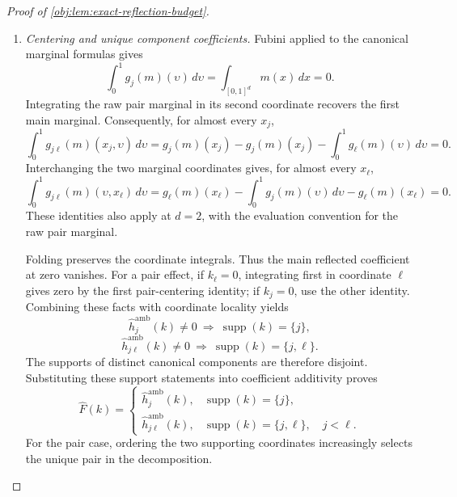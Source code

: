 \begin{proof}[Proof of \cref{obj:lem:exact-reflection-budget}]
\begin{enumerate}
\item \textit{Centering and unique component coefficients.}
Fubini applied to the canonical marginal formulas gives
\[
\int_0^1g_j(m)(\upsilon)\,d\upsilon
=
\int_{[0,1]^d}m(x)\,dx
=
0.
\]
Integrating the raw pair marginal in its second coordinate recovers the first main marginal. Consequently, for almost every \(x_j\),
\[
\int_0^1g_{j\ell}(m)(x_j,\upsilon)\,d\upsilon
=
g_j(m)(x_j)-g_j(m)(x_j)
-\int_0^1g_\ell(m)(\upsilon)\,d\upsilon
=
0.
\]
Interchanging the two marginal coordinates gives, for almost every \(x_\ell\),
\[
\int_0^1g_{j\ell}(m)(\upsilon,x_\ell)\,d\upsilon
=
g_\ell(m)(x_\ell)
-\int_0^1g_j(m)(\upsilon)\,d\upsilon
-g_\ell(m)(x_\ell)
=
0.
\]
These identities also apply at \(d=2\), with the evaluation convention for the raw pair marginal.

Folding preserves the coordinate integrals. Thus the main reflected coefficient at zero vanishes. For a pair effect, if \(k_\ell=0\), integrating first in coordinate \(\ell\) gives zero by the first pair-centering identity; if \(k_j=0\), use the other identity. Combining these facts with coordinate locality yields
\[
\widehat h_j^{\mathrm{amb}}(k)\neq0
\ \Longrightarrow\
\operatorname{supp}(k)=\{j\},
\]
\[
\widehat h_{j\ell}^{\mathrm{amb}}(k)\neq0
\ \Longrightarrow\
\operatorname{supp}(k)=\{j,\ell\}.
\]
The supports of distinct canonical components are therefore disjoint. Substituting these support statements into coefficient additivity proves
\[
\widehat F(k)
=
\begin{cases}
\widehat h_j^{\mathrm{amb}}(k),
&\operatorname{supp}(k)=\{j\},\\
\widehat h_{j\ell}^{\mathrm{amb}}(k),
&\operatorname{supp}(k)=\{j,\ell\},\quad j<\ell.
\end{cases}
\]
For the pair case, ordering the two supporting coordinates increasingly selects the unique pair in the decomposition.


\end{enumerate}
\end{proof}
